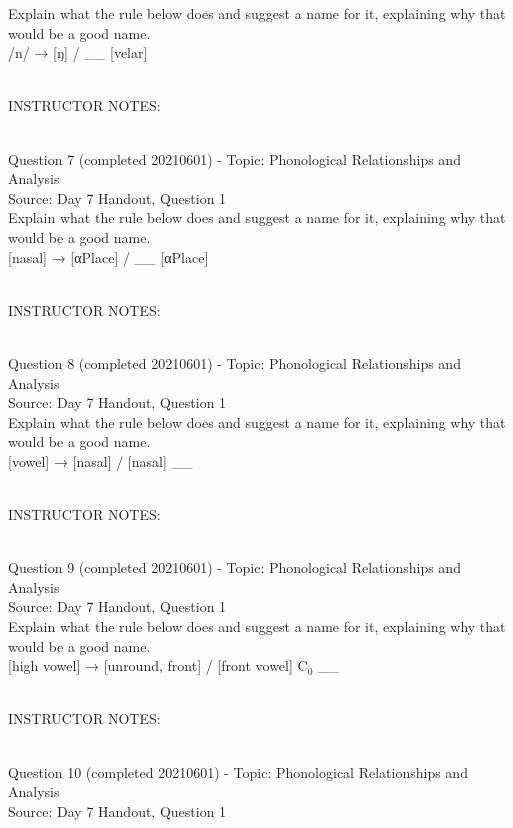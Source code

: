 \documentclass[12pt]{article}
\begin{document}
Explain what the rule below does and suggest a name for it, explaining why that would be a good name.\\

/n/ → {[ŋ]} / \_\_ {[velar]}


~\\
INSTRUCTOR NOTES: 


~\\

{\large Question 7} (completed 20210601) - Topic: Phonological Relationships and Analysis\\
Source: Day 7 Handout, Question 1\\

Explain what the rule below does and suggest a name for it, explaining why that would be a good name.\\

{[nasal]} → {[αPlace]} / \_\_ {[αPlace]}


~\\
INSTRUCTOR NOTES: 


~\\

{\large Question 8} (completed 20210601) - Topic: Phonological Relationships and Analysis\\
Source: Day 7 Handout, Question 1\\

Explain what the rule below does and suggest a name for it, explaining why that would be a good name.\\

{[vowel]} → {[nasal]} / {[nasal]} \_\_


~\\
INSTRUCTOR NOTES: 


~\\

{\large Question 9} (completed 20210601) - Topic: Phonological Relationships and Analysis\\
Source: Day 7 Handout, Question 1\\

Explain what the rule below does and suggest a name for it, explaining why that would be a good name.\\

{[high vowel]} →  {[unround, front]} / {[front vowel]} C$_0$ \_\_


~\\
INSTRUCTOR NOTES: 


~\\

{\large Question 10} (completed 20210601) - Topic: Phonological Relationships and Analysis\\
Source: Day 7 Handout, Question 1\\
\end{document}
